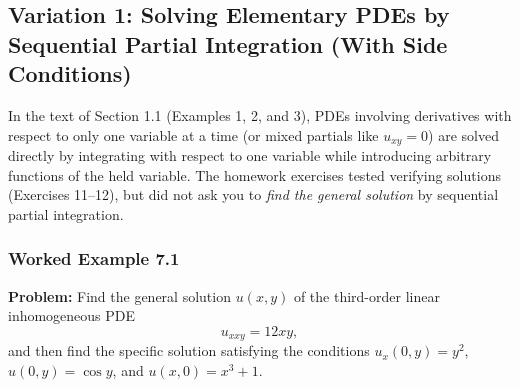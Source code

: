 \documentclass[11pt,a4paper]{article}
\begin{document}
\subsection{Variation 1: Solving Elementary PDEs by Sequential Partial Integration (With Side Conditions)}
In the text of Section 1.1 (Examples 1, 2, and 3), PDEs involving derivatives with respect to only one variable at a time (or mixed partials like $u_{xy} = 0$) are solved directly by integrating with respect to one variable while introducing arbitrary functions of the held variable. The homework exercises tested verifying solutions (Exercises 11--12), but did not ask you to \emph{find the general solution} by sequential partial integration.

\subsubsection*{Worked Example 7.1}
\textbf{Problem:} Find the general solution $u(x, y)$ of the third-order linear inhomogeneous PDE
\[
    u_{xxy} = 12xy,
\]
and then find the specific solution satisfying the conditions $u_x(0, y) = y^2$, $u(0, y) = \cos y$, and $u(x, 0) = x^3 + 1$.
\end{document}
